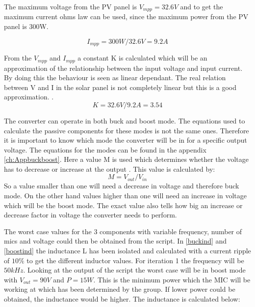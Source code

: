 The maximum voltage from the PV panel is $V_{mpp}=32.6V$ 
and to get the maximum current ohms law can be used, since the maximum power from the PV panel is 300W.

\begin{equation}
I_{mpp} = 300W/32.6V = 9.2A
\end{equation} 

From the $V_{mpp}$ and $I_{mpp}$ a constant K is calculated which will be an approximation of the relationship between the input voltage and input current.
By doing this the behaviour is seen as linear dependant. The real relation between V and I in the solar panel is not completely linear but this is a good approximation. .
\begin{equation}
 K = 32.6V/9.2A = 3.54
 \end{equation} 

The converter can operate in both buck and boost mode. The equations used to calculate the passive components for these modes is not the same ones. Therefore it is important to know which mode the converter will be in for a specific output voltage.  
The equations for the modes can be found in the appendix \ref{ch:Appbuckboost}. Here a value M is used which determines whether the voltage has to decrease or increase at the output . This value is calculated by:
\begin{equation}
M = V_{out}/V_{in}
\end{equation}
So a value smaller than one will need a decrease in voltage and therefore buck mode. On the other hand values higher than one will need an increase in voltage which will be the boost mode. The exact value also tells how big an increase or decrease factor in voltage the converter needs to perform.

The worst case values for the 3 components with variable frequency, number of mics and voltage could then be obtained from the script. 
In \ref{buckind} and \ref{boostind} the inductance L has been isolated and calculated with a current ripple of $10\%$ to get the different inductor values. For iteration 1 the frequency will be $50kHz$. Looking at the output of the script the worst case will be in boost mode with $V_{out}=90V$ and $P=15W$. This is the minimum power which the MIC will be working at which has been determined by the group. If lower power could be obtained, the inductance would be higher. The inductance is calculated below:

